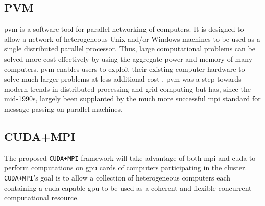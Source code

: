 \subsection{PVM}

\Gls{pvm} is a software tool for parallel networking of computers. It is
designed to allow a network of heterogeneous Unix and/or Windows machines to be
used as a single distributed parallel processor. Thus, large computational
problems can be solved more cost effectively by using the aggregate power and
memory of many computers. \gls{pvm} enables users to exploit their existing
computer hardware to solve much larger problems at less additional cost
\cite{website:Computer-Science-and-Division}. \gls{pvm} was a step towards
modern trends in distributed processing and grid computing but has, since the
mid-1990s, largely been supplanted by the much more successful \gls{mpi}
standard for message passing on parallel machines.

\subsection{CUDA+MPI}

The proposed \texttt{CUDA+MPI} framework will take advantage of both \gls{mpi}
and \gls{cuda} to perform computations on \gls{gpu} cards of computers
participating in the cluster. \texttt{CUDA+MPI}'s goal is to allow a collection
of heterogeneous computers each containing a \gls{cuda}-capable \gls{gpu} to be
used as a coherent and flexible concurrent computational resource.
